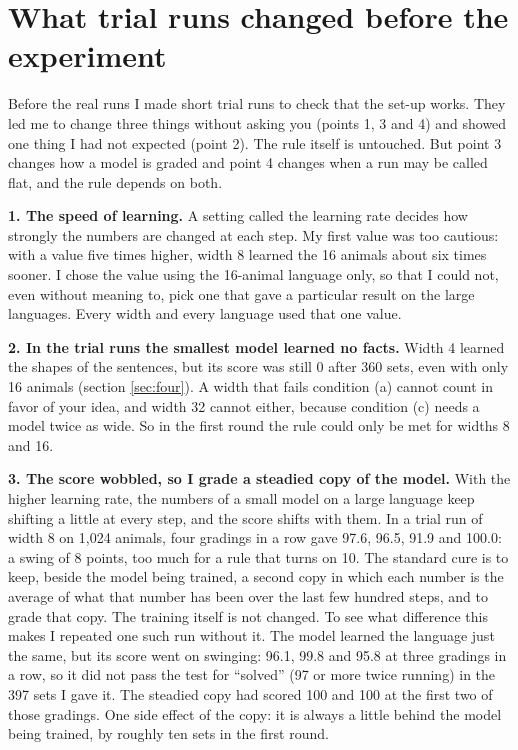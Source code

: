 \section{What trial runs changed before the experiment}\label{sec:changes}

Before the real runs I made short trial runs to check that the set-up works. They led me to
change three things without asking you (points 1, 3 and 4) and showed one thing I had not
expected (point 2). The rule itself is untouched. But point 3 changes how a model is graded and
point 4 changes when a run may be called flat, and the rule depends on both.

\textbf{1. The speed of learning.} A setting called the learning rate decides how strongly the
numbers are changed at each step. My first value was too cautious: with a value five times
higher, width 8 learned the 16 animals about six times sooner. I chose the value using the
16-animal language only, so that I could not, even without meaning to, pick one that gave a
particular result on the large languages. Every width and every language used that one value.

\textbf{2. In the trial runs the smallest model learned no facts.} Width 4 learned the shapes
of the sentences, but its score was still 0 after 360 sets, even with only 16 animals (section
\ref{sec:four}). A width that fails condition (a) cannot count in favor of your idea, and
width 32 cannot either, because condition (c) needs a model twice as wide. So in the first
round the rule could only be met for widths 8 and 16.

\textbf{3. The score wobbled, so I grade a steadied copy of the model.} With the higher
learning rate, the numbers of a small model on a large language keep shifting a little at every
step, and the score shifts with them. In a trial run of width 8 on 1,024 animals, four gradings
in a row gave 97.6, 96.5, 91.9 and 100.0: a swing of 8 points, too much for a rule that turns on
10. The standard cure is to keep, beside the model being trained, a second copy in which each
number is the average of what that number has been over the last few hundred steps, and to
grade that copy. The training itself is not changed. To see what difference this makes I
repeated one such run without it. The model learned the language just the same, but its score
went on swinging: 96.1, 99.8 and 95.8 at three gradings in a row, so it did not pass the test
for ``solved'' (97 or more twice running) in the 397 sets I gave it. The steadied copy had
scored 100 and 100 at the first two of those gradings. One side effect of the copy: it is always a little
behind the model being trained, by roughly ten sets in the first round.

